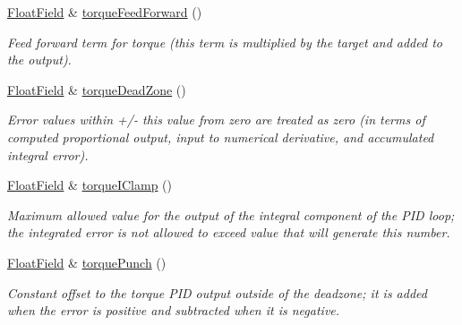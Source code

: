 \begin{DoxyCompactItemize}
\hyperlink{classhebi_1_1Command_1_1FloatField}{Float\+Field} \& \hyperlink{classhebi_1_1Command_1_1Settings_1_1Actuator_1_1TorqueGains_ab0e19d5a048f0190d73a1fb9fe9708da}{torque\+Feed\+Forward} ()
\begin{DoxyCompactList}\small\item\em Feed forward term for torque (this term is multiplied by the target and added to the output). \end{DoxyCompactList}\item 
\mbox{\label{classhebi_1_1Command_1_1Settings_1_1Actuator_1_1TorqueGains_af6a046c9f2382ecd14a175bda59e6dae}} 
\hyperlink{classhebi_1_1Command_1_1FloatField}{Float\+Field} \& \hyperlink{classhebi_1_1Command_1_1Settings_1_1Actuator_1_1TorqueGains_af6a046c9f2382ecd14a175bda59e6dae}{torque\+Dead\+Zone} ()
\begin{DoxyCompactList}\small\item\em Error values within +/-\/ this value from zero are treated as zero (in terms of computed proportional output, input to numerical derivative, and accumulated integral error). \end{DoxyCompactList}\item 
\mbox{\label{classhebi_1_1Command_1_1Settings_1_1Actuator_1_1TorqueGains_ab9988770fc6d3d5132d6ee91671868a5}} 
\hyperlink{classhebi_1_1Command_1_1FloatField}{Float\+Field} \& \hyperlink{classhebi_1_1Command_1_1Settings_1_1Actuator_1_1TorqueGains_ab9988770fc6d3d5132d6ee91671868a5}{torque\+I\+Clamp} ()
\begin{DoxyCompactList}\small\item\em Maximum allowed value for the output of the integral component of the P\+ID loop; the integrated error is not allowed to exceed value that will generate this number. \end{DoxyCompactList}\item 
\mbox{\label{classhebi_1_1Command_1_1Settings_1_1Actuator_1_1TorqueGains_a0a2c421d618aef63622cab0fc46d27e7}} 
\hyperlink{classhebi_1_1Command_1_1FloatField}{Float\+Field} \& \hyperlink{classhebi_1_1Command_1_1Settings_1_1Actuator_1_1TorqueGains_a0a2c421d618aef63622cab0fc46d27e7}{torque\+Punch} ()
\begin{DoxyCompactList}\small\item\em Constant offset to the torque P\+ID output outside of the deadzone; it is added when the error is positive and subtracted when it is negative. \end{DoxyCompactList}\item 

\end{DoxyCompactItemize}
